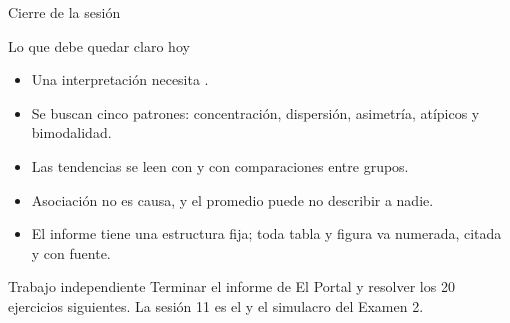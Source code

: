 \documentclass[aspectratio=169,10pt]{beamer}
\begin{document}
\begin{frame}{Cierre de la sesión}
  \begin{block}{Lo que debe quedar claro hoy}
    \scriptsize
    \begin{itemize}\setlength{\itemsep}{0.02cm}
      \item Una interpretación necesita .
      \item Se buscan cinco patrones: concentración, dispersión, asimetría,
            atípicos y bimodalidad.
      \item Las tendencias se leen con  y con
            comparaciones entre grupos.
      \item Asociación no es causa, y el promedio puede no describir a nadie.
      \item El informe tiene una estructura fija; toda tabla y figura va
            numerada, citada y con fuente.
    \end{itemize}
  \end{block}

  \vspace{0.1cm}
  \begin{alertblock}{Trabajo independiente}
    \scriptsize
    Terminar el informe de El Portal y resolver los 20 ejercicios siguientes.
    La sesión 11 es el  y el
    simulacro del Examen 2.
  \end{alertblock}
\end{frame}
\end{document}
